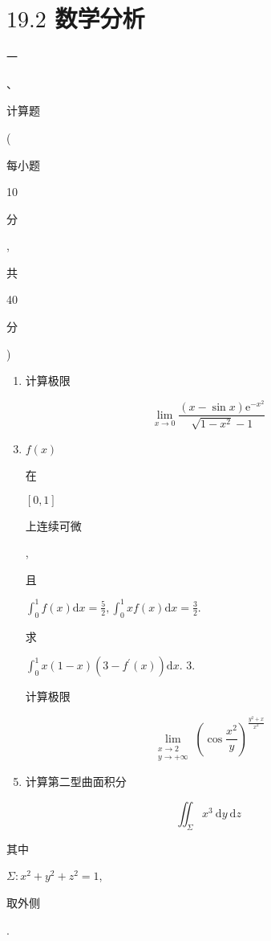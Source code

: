 \documentclass[10pt]{article}
\begin{document}
\section{$19.2$ 数学分析}
\begin{CJK}{UTF8}{mj}一\end{CJK}、\begin{CJK}{UTF8}{mj}计算题\end{CJK} (\begin{CJK}{UTF8}{mj}每小题\end{CJK} 10 \begin{CJK}{UTF8}{mj}分\end{CJK}, \begin{CJK}{UTF8}{mj}共\end{CJK} 40 \begin{CJK}{UTF8}{mj}分\end{CJK})

\begin{enumerate}
  \item \begin{CJK}{UTF8}{mj}计算极限\end{CJK}
\end{enumerate}
$$
\lim _{x \rightarrow 0} \frac{(x-\sin x) \mathrm{e}^{-x^{2}}}{\sqrt{1-x^{2}}-1}
$$

\begin{enumerate}
  \setcounter{enumi}{2}
  \item $f(x)$ \begin{CJK}{UTF8}{mj}在\end{CJK} $[0,1]$ \begin{CJK}{UTF8}{mj}上连续可微\end{CJK}, \begin{CJK}{UTF8}{mj}且\end{CJK} $\int_{0}^{1} f(x) \mathrm{d} x=\frac{5}{2}, \int_{0}^{1} x f(x) \mathrm{d} x=\frac{3}{2}$. \begin{CJK}{UTF8}{mj}求\end{CJK} $\int_{0}^{1} x(1-x)\left(3-f^{\prime}(x)\right) \mathrm{d} x$. 3. \begin{CJK}{UTF8}{mj}计算极限\end{CJK}
\end{enumerate}
$$
\lim _{\substack{x \rightarrow 2 \\ y \rightarrow+\infty}}\left(\cos \frac{x^{2}}{y}\right)^{\frac{y^{2}+x}{x^{2}}}
$$

\begin{enumerate}
  \setcounter{enumi}{4}
  \item \begin{CJK}{UTF8}{mj}计算第二型曲面积分\end{CJK}
\end{enumerate}
$$
\iint_{\Sigma} x^{3} \mathrm{~d} y \mathrm{~d} z
$$
\begin{CJK}{UTF8}{mj}其中\end{CJK} $\Sigma: x^{2}+y^{2}+z^{2}=1$, \begin{CJK}{UTF8}{mj}取外侧\end{CJK}.
\end{document}
